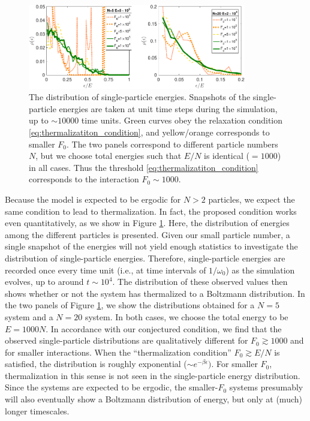 \documentclass[a4paper, onecolumn]{revtex4-1}
\begin{document}
\begin{figure}[tb]
\centering
%
\includegraphics[width=0.85\textwidth]{Boltzmann_2panels_01-crop.pdf}
%
\caption{The distribution of single-particle energies.  Snapshots of the single-particle energies
  are taken at unit time steps during the simulation, up to $\sim 10000$ time units.  Green curves
  obey the relaxation condition \eqref{eq:thermalizatiton_condition}, and yellow/orange corresponds
  to smaller $F_0$.  The two panels correspond to different particle numbers $N$, but we choose
  total energies such that $E/N$ is identical ($=1000$) in all cases.  Thus the threshold
  \eqref{eq:thermalizatiton_condition} corresponds to the interaction $F_0\sim1000$. }
\label{fig:thermalization5}
\end{figure}



Because the model is expected to be ergodic for $N>2$ particles, we expect the same condition to
lead to thermalization.  In fact, the proposed condition works even quantitatively, as we show in
Figure \ref{fig:thermalization5}.  Here, the distribution of energies among the different particles
is presented.  Given our small particle number, a single snapshot of the energies will not yield
enough statistics to investigate the distribution of single-particle energies.  Therefore,
single-particle energies are recorded once every time unit (i.e., at time intervals of $1/\omega_0$)
as the simulation evolves, up to around $t\sim10^4$.  The distribution of these observed values then
shows whether or not the system has thermalized to a Boltzmann distribution.  In the two panels of
Figure \ref{fig:thermalization5}, we show the distributions obtained for a $N=5$ system and a $N=20$
system.  In both cases, we choose the total energy to be $E=1000N$.  In accordance with our
conjectured condition, we find that the observed single-particle distributions are qualitatively
different for $F_0\gtrsim1000$ and for smaller interactions.  When the ``thermalization condition''
$F_0\gtrsim E/N$ is satisfied, the distribution is roughly exponential ($\sim e^{-\beta\epsilon})$.
For smaller $F_0$, thermalization in this sense is not seen in the single-particle energy
distribution.  Since the systems are expected to be ergodic, the smaller-$F_0$ systems presumably
will also eventually show a Boltzmann distribution of energy, but only at (much) longer timescales.
\end{document}
